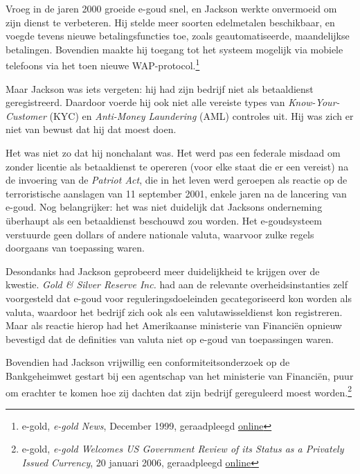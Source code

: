\documentclass[
  a5paper,
  smalldemyvopaper,11pt,twoside,onecolumn,openright,extrafontsizes,
hidelinks]{memoir}
\begin{document}

Vroeg in de jaren 2000 groeide e-goud snel, en Jackson werkte onvermoeid
om zijn dienst te verbeteren. Hij stelde meer soorten edelmetalen
beschikbaar, en voegde tevens nieuwe betalingsfuncties toe, zoals
geautomatiseerde, maandelijkse betalingen. Bovendien maakte hij toegang
tot het systeem mogelijk via mobiele telefoons via het toen nieuwe
WAP-protocol.\footnote{\hspace{0pt}e-gold, \emph{e-gold News}, December
  1999, geraadpleegd
  \href{https://web.archive.org/web/20001209053900fw_/http://www.e-gold.com/news.html.}{online}}

Maar Jackson was iets vergeten: hij had zijn bedrijf niet als
betaaldienst geregistreerd. Daardoor voerde hij ook niet alle vereiste
types van \emph{Know-Your-Customer} (KYC) en \emph{Anti-Money
Laundering} (AML) controles uit. Hij was zich er niet van bewust dat hij
dat moest doen.

Het was niet zo dat hij nonchalant was. Het werd pas een federale
misdaad om zonder licentie als betaaldienst te opereren (voor elke staat
die er een vereist) na de invoering van de \emph{Patriot Act}, die in
het leven werd geroepen als reactie op de terroristische aanslagen van
11 september 2001, enkele jaren na de lancering van e-goud. Nog
belangrijker: het was niet duidelijk dat Jacksons onderneming überhaupt
als een betaaldienst beschouwd zou worden. Het e-goudsysteem verstuurde
geen dollars of andere nationale valuta, waarvoor zulke regels doorgaans
van toepassing waren.

Desondanks had Jackson geprobeerd meer duidelijkheid te krijgen over de
kwestie. \emph{Gold \& Silver Reserve Inc.} had aan de relevante
overheidsinstanties zelf voorgesteld dat e-goud voor
reguleringsdoeleinden gecategoriseerd kon worden als valuta, waardoor
het bedrijf zich ook als een valutawisseldienst kon registreren. Maar
als reactie hierop had het Amerikaanse ministerie van Financiën opnieuw
bevestigd dat de definities van valuta niet op e-goud van toepassingen
waren.

Bovendien had Jackson vrijwillig een conformiteitsonderzoek op de
Bankgeheimwet gestart bij een agentschap van het ministerie van
Financiën, puur om erachter te komen hoe zij dachten dat zijn bedrijf
gereguleerd moest worden.\footnote{\hspace{0pt}e-gold, \emph{e-gold
  Welcomes US Government Review of its Status as a Privately Issued
  Currency}, 20 januari 2006, geraadpleegd
  \href{https://web.archive.org/web/20060304203618if_/http://www.e-gold.com/letter2.html.}{online}}
\end{document}
